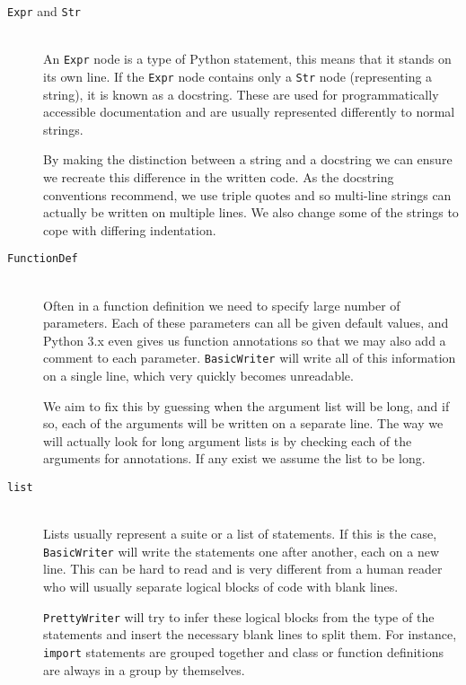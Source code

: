 \documentclass[twoside,a4paper]{report}
\begin{document}
\begin{description}
\item[\texttt{Expr} and \texttt{Str}] \hfill \\
An \texttt{Expr} node is a type of Python statement, this means that it stands on its own line. If the \texttt{Expr} node contains only a \texttt{Str} node
(representing a string), it is known as a docstring. These are used for programmatically accessible documentation and are usually represented
differently to normal strings.

By making the distinction between a string and a docstring we can ensure we recreate this difference in the written code. As the docstring conventions 
\cite{docstr} recommend, we use triple quotes and so multi-line strings can actually be written on multiple lines. We also change some of the strings to
cope with differing indentation.

\item[\texttt{FunctionDef}] \hfill \\
Often in a function definition we need to specify large number of parameters. Each of these parameters can all be given default values, and Python 3.x
even gives us function annotations so that we may also add a comment to each parameter. \texttt{BasicWriter} will write all of this information on a single
line, which very quickly becomes unreadable.

We aim to fix this by guessing when the argument list will be long, and if so, each of the arguments will be written on a separate line. The way we will
actually look for long argument lists is by checking each of the arguments for annotations. If any exist we assume the list to be long.

\item[\texttt{list}] \hfill \\
Lists usually represent a suite or a list of statements. If this is the case, \texttt{BasicWriter} will write the statements one after another, each on a
new line. This can be hard to read and is very different from a human reader who will usually separate logical blocks of code with blank lines.

\texttt{PrettyWriter} will try to infer these logical blocks from the type of the statements and insert the necessary blank lines to split them. For instance,
\texttt{import} statements are grouped together and class or function definitions are always in a group by themselves.
\end{description}
\end{document}
